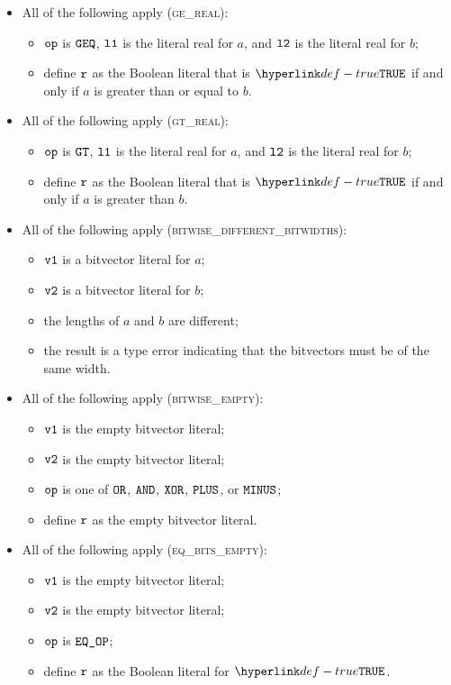 \documentclass{book}
\begin{document}
\begin{itemize}
  \item All of the following apply (\textsc{ge\_real}):
  \begin{itemize}
    \item $\texttt{op}$ is $\texttt{GEQ}$, $\texttt{l1}$ is the literal real for $a$, and $\texttt{l2}$ is the literal real for $b$;
    \item define $\texttt{r}$ as the Boolean literal that is $\True$ if and only if $a$ is greater than or equal to $b$.
  \end{itemize}

  \item All of the following apply (\textsc{gt\_real}):
  \begin{itemize}
    \item $\texttt{op}$ is $\texttt{GT}$, $\texttt{l1}$ is the literal real for $a$, and $\texttt{l2}$ is the literal real for $b$;
    \item define $\texttt{r}$ as the Boolean literal that is $\True$ if and only if $a$ is greater than $b$.
  \end{itemize}

  \item All of the following apply (\textsc{bitwise\_different\_bitwidths}):
  \begin{itemize}
    \item $\texttt{v1}$ is a bitvector literal for $a$;
    \item $\texttt{v2}$ is a bitvector literal for $b$;
    \item the lengths of $a$ and $b$ are different;
    \item the result is a type error indicating that the bitvectors must be of the same width.
  \end{itemize}

  \item All of the following apply (\textsc{bitwise\_empty}):
  \begin{itemize}
    \item $\texttt{v1}$ is the empty bitvector literal;
    \item $\texttt{v2}$ is the empty bitvector literal;
    \item $\texttt{op}$ is one of $\texttt{OR}$, $\texttt{AND}$, $\texttt{XOR}$, $\texttt{PLUS}$, or $\texttt{MINUS}$;
    \item define $\texttt{r}$ as the empty bitvector literal.
  \end{itemize}

  \item All of the following apply (\textsc{eq\_bits\_empty}):
  \begin{itemize}
    \item $\texttt{v1}$ is the empty bitvector literal;
    \item $\texttt{v2}$ is the empty bitvector literal;
    \item $\texttt{op}$ is $\texttt{EQ\_OP}$;
    \item define $\texttt{r}$ as the Boolean literal for $\True$.
  \end{itemize}


\end{itemize}
\end{document}

